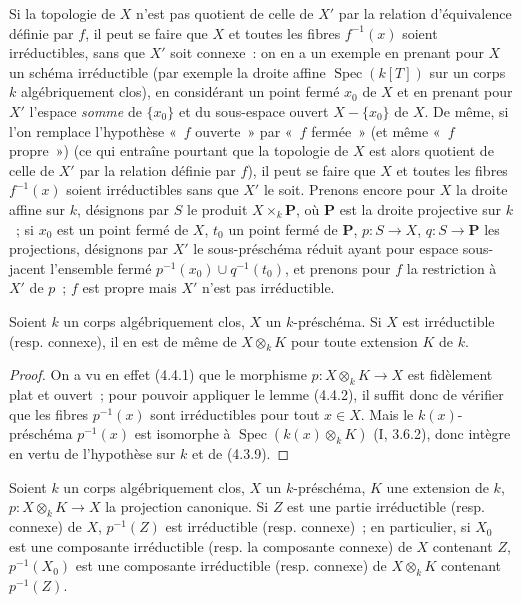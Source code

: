 \begin{remark}[4.4.3]
\label{IV.2.4.4.3-fr}
Si la topologie de $X$ n'est pas quotient de celle de $X'$ par la relation
d'équivalence définie par $f$, il peut se faire que $X$ et toutes les fibres
$f^{-1}(x)$ soient irréductibles, sans que $X'$ soit connexe~: on en a un
exemple en prenant pour $X$ un schéma irréductible (par exemple la droite
affine $\operatorname{Spec}(k[T])$ sur un corps $k$ algébriquement clos), en
considérant un point fermé $x_0$ de $X$ et en prenant pour $X'$ l'espace
\emph{somme} de $\{x_0\}$ et du sous-espace ouvert $X-\{x_0\}$ de $X$. De
même, si l'on remplace l'hypothèse «~$f$ ouverte~» par «~$f$ fermée~» (et même
«~$f$ propre~») (ce qui entraîne pourtant que la topologie de $X$ est alors
quotient de celle de $X'$ par la relation définie par $f$), il peut se faire
que $X$ et toutes les fibres $f^{-1}(x)$ soient irréductibles sans que $X'$ le
soit. Prenons encore pour $X$ la droite affine sur $k$, désignons par $S$ le
produit $X\times_k\mathbf P$, où $\mathbf P$ est la droite projective sur
$k$~; si $x_0$ est un point fermé de $X$, $t_0$ un point fermé de $\mathbf P$,
$p:S\to X$, $q:S\to\mathbf P$ les projections, désignons par $X'$ le
sous-préschéma réduit ayant pour espace sous-jacent l'ensemble fermé
$p^{-1}(x_0)\cup q^{-1}(t_0)$, et prenons pour $f$ la restriction à $X'$ de
$p$~; $f$ est propre mais $X'$ n'est pas irréductible.
\end{remark}

\begin{theorem}[4.4.4]
\label{IV.2.4.4.4-fr}
Soient $k$ un corps algébriquement clos, $X$ un $k$-préschéma. Si $X$ est
irréductible (resp. connexe), il en est de même de $X\otimes_k K$ pour toute
extension $K$ de $k$.
\end{theorem}

\begin{proof}
On a vu en effet (4.4.1) que le morphisme $p:X\otimes_k K\to X$ est
fidèlement plat et ouvert~; pour pouvoir appliquer le lemme (4.4.2), il suffit
donc de vérifier que les fibres $p^{-1}(x)$ sont irréductibles pour tout
$x\in X$. Mais le $k(x)$-préschéma $p^{-1}(x)$ est isomorphe à
$\operatorname{Spec}(k(x)\otimes_k K)$ (I, 3.6.2), donc intègre en vertu de
l'hypothèse sur $k$ et de (4.3.9).
\end{proof}

\begin{corollary}[4.4.5]
\label{IV.2.4.4.5-fr}
Soient $k$ un corps algébriquement clos, $X$ un $k$-préschéma, $K$ une
extension de $k$, $p:X\otimes_k K\to X$ la projection canonique. Si $Z$ est
une partie irréductible (resp. connexe) de $X$, $p^{-1}(Z)$ est irréductible
(resp. connexe)~; en particulier, si $X_0$ est une composante irréductible
(resp. la composante connexe) de $X$ contenant $Z$, $p^{-1}(X_0)$ est une
composante irréductible (resp. connexe) de $X\otimes_k K$ contenant
$p^{-1}(Z)$.
\end{corollary}

